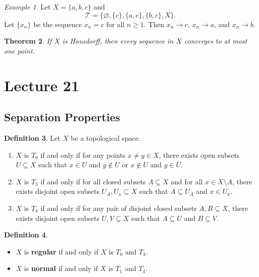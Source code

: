 \documentclass[ 12pt ]{article}
\newcounter{lecture_num}
\theoremstyle{plain}
\theoremstyle{plain}
\newtheorem{theorem}{Theorem}[lecture_num]
\theoremstyle{definition}
\newtheorem{definition}[theorem]{Definition}
\theoremstyle{remark}
\newtheorem{example}[theorem]{Example}
\begin{document}
\begin{example}
	Let $X = \{a, b, c\}$ and $$\mathcal{T} = \{ \varnothing, \{ c \}, \{ a, c \}, \{ b, c \}, X \}.$$ Let $\{ x_n \}$ be the sequence $x_n = c$ for all $n \geq 1$. Then $x_n \to c$,
	$x_n \to a$, and $x_n \to b$.
\end{example}

\begin{theorem}
	If $X$ is Hausdorff, then every sequence in $X$ converges to at most one point.
\end{theorem}

\setcounter{lecture_num}{21}
\setcounter{theorem}{0}
\section*{Lecture 21}

\subsection*{Separation Properties}

\begin{definition}
	Let $X$ be a topological space.
	\begin{enumerate}
		\item $X$ is $T_0$ if and only if for any points $x \neq y \in X$, there exists open subsets $U \subseteq X$ such that $x \in U$ and $y \notin U$ or $x \notin U$ and $y \in U$.
		\item $X$ is $T_3$ if and only if for all closed subsets $A \subseteq X$ and for all $x \in X \setminus A$, there exists disjoint open subsets $U_A, U_x \subseteq X$ such that
			$A \subseteq U_A$ and $x \in U_x$.
		\item $X$ is $T_4$ if and only if for any pair of disjoint closed subsets $A, B \subseteq X$, there exists disjoint open subsets $U, V \subseteq X$ such that $A \subseteq U$ and
			$B \subseteq V$.	
	\end{enumerate}
\end{definition}

\begin{definition} $ $
	\begin{itemize}
		\item $X$ is \textbf{regular} if and only if $X$ is $T_0$ and $T_3$.
		\item $X$ is \textbf{normal} if and only if $X$ is $T_1$ and $T_4$.
	\end{itemize}
\end{definition}
\end{document}
